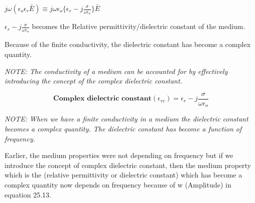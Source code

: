\begin{center}
$j \omega(\epsilon_{o}\epsilon_{r}\bar{E}) \equiv j\omega\epsilon_{o}\bigg\{\epsilon_{r} -j \frac{\sigma}{\omega\epsilon_{o}}\bigg\}\bar{E}$ 
\end{center}

$\epsilon_{r} -j \frac{\sigma}{\omega\epsilon_{o}}$ becomes the Relative permittivity/dielectric constant of the medium.

Because of the finite conductivity, the dielectric constant has become a complex quantity.

\textit{NOTE: The conductivity of a medium can be accounted for by effectively introducing the concept of the complex dielectric constant.}

\begin{equation}
\textbf{Complex dielectric constant} (\epsilon_{rc}) = \epsilon_{r} -j \frac{\sigma}{\omega\epsilon_{o}}
\end{equation}

\textit{NOTE: When we have a finite conductivity in a medium the dielectric constant becomes a complex quantity. The dielectric constant has become a function of frequency.}

Earlier, the medium properties were not depending on frequency but if we introduce the concept of complex dielectric constant, then the medium property which is the (relative permittivity or dielectric constant) which has become a complex quantity now depends on frequency because of w (Amplitude) in equation 25.13.

